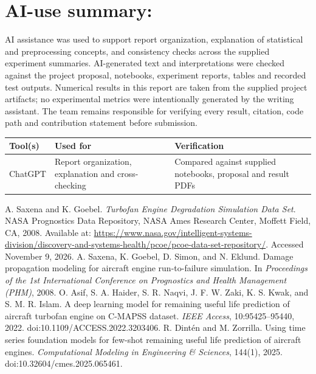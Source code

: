 \documentclass[10pt,a4paper]{article}
\begin{document}
\section*{AI-use summary:}
AI assistance was used to support report organization, explanation of statistical and preprocessing concepts, and consistency checks across the supplied experiment summaries. AI-generated text and interpretations were checked against the project proposal, notebooks, experiment reports, tables and recorded test outputs. Numerical results in this report are taken from the supplied project artifacts; no experimental metrics were intentionally generated by the writing assistant. The team remains responsible for verifying every result, citation, code path and contribution statement before submission.

\begin{center}\begin{tabularx}{\linewidth}{@{}lYl@{}}\toprule
Tool(s) & Used for & Verification\\\midrule
ChatGPT & Report organization, explanation and cross-checking & Compared against supplied notebooks, proposal and result PDFs\\\bottomrule\end{tabularx}\end{center}

\renewcommand{\refname}{References:}
\begin{thebibliography}{9}
 A. Saxena and K. Goebel. \emph{Turbofan Engine Degradation Simulation Data Set}. NASA Prognostics Data Repository, NASA Ames Research Center, Moffett Field, CA, 2008. Available at: \url{https://www.nasa.gov/intelligent-systems-division/discovery-and-systems-health/pcoe/pcoe-data-set-repository/}. Accessed November 9, 2026.
 A. Saxena, K. Goebel, D. Simon, and N. Eklund. Damage propagation modeling for aircraft engine run-to-failure simulation. In \emph{Proceedings of the 1st International Conference on Prognostics and Health Management (PHM)}, 2008.
 O. Asif, S. A. Haider, S. R. Naqvi, J. F. W. Zaki, K. S. Kwak, and S. M. R. Islam. A deep learning model for remaining useful life prediction of aircraft turbofan engine on C-MAPSS dataset. \emph{IEEE Access}, 10:95425--95440, 2022. doi:10.1109/ACCESS.2022.3203406.
 R. Dint\'en and M. Zorrilla. Using time series foundation models for few-shot remaining useful life prediction of aircraft engines. \emph{Computational Modeling in Engineering \& Sciences}, 144(1), 2025. doi:10.32604/cmes.2025.065461.
\end{thebibliography}
\end{document}
